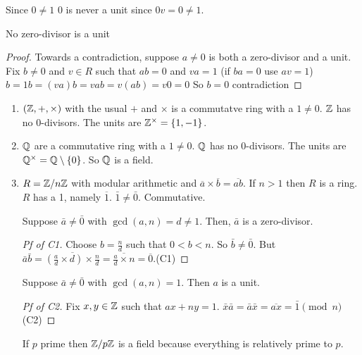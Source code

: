 \documentclass[notes.tex]{subfiles}
\begin{document}
\begin{remark}
	Since $0\ne 1$ 0 is never a unit since $0v = 0 \ne 1$.
\end{remark}

\begin{proposition}
	No zero-divisor is a unit
\end{proposition}
\begin{proof}
	Towards a contradiction, suppose $a\ne 0$ is both a zero-divisor and a unit.
	Fix $b\ne 0$ and $v\in R$ such that $ab = 0$ and $va = 1$ (if $ba = 0$ use $av = 1$)
	$b = 1b = (va)b = vab = v(ab) = v0 = 0$
	So $b=0$ contradiction
\end{proof}
\begin{eg}\leavevmode
\begin{enumerate}
	\item $(\mathbb{Z}, +, \times)$ with the usual $+$ and $\times$ is a commutatve ring with a $1\ne 0$.
	$\mathbb{Z}$ has no 0-divisors.
	The units are $\mathbb{Z}^\times = \{1, -1\}$.
	\item $\mathbb{Q}$ are a commutative ring with a $1\ne 0$.
	$\mathbb{Q}$ has no 0-divisors. The units are $\mathbb{Q}^\times = \mathbb{Q}\setminus \{0\}$. So $\mathbb{Q}$ is a field.
	\item $R = \mathbb{Z}/n\mathbb{Z}$ with modular arithmetic and $\overline a \times\overline b = \overline{ab}$. If $n>1$ then $R$ is a ring. $R$ has a 1, namely $\overline1$. $\bar1\ne\bar0$. Commutative.
	\begin{claim}[C1]
		Suppose $\bar a\ne \bar 0$ with $\gcd(a, n) = d\ne 1$.
		Then, $\bar a$ is a zero-divisor.
	\end{claim}
	\begin{proof}[Pf of C1]
		Choose $b = \frac{n}{d}$ such that $0 < b < n$.
		So $\bar b \ne \bar 0$. But $\bar a\bar b = \overline{\left(\frac{a}{d}\times d\right)\times \frac{n}{d}} = \overline{\frac{a}{d}\times n} = \overline0$.\qedhere(C1)
	\end{proof}
	\begin{claim}[C2]
		Suppose $\bar a\ne \bar 0$ with $\gcd(a, n) = 1$. Then $a$ is a unit. 
	\end{claim}
	\begin{proof}[Pf of C2]
		Fix $x, y\in \mathbb{Z}$ such that $ax + ny = 1$. 
		$\bar x\bar a = \bar a \bar x = \overline{ax} = \bar 1\pmod n$\qedhere(C2)
	\end{proof}
	\begin{corollary}
		If $p$ prime then $\mathbb{Z}/p\mathbb{Z}$ is a field because everything is relatively prime to $p$.
	\end{corollary}
\end{enumerate}
\end{eg}
\end{document}
